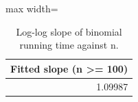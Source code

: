 \begin{table}
\centering
\small
\caption{Log-log slope of binomial running time against n.}
\label{tab:e7_slope}
\begin{adjustbox}{max width=\textwidth}
\begin{tabular}{r}
\toprule
Fitted slope (n >= 100) \\
\midrule
1.09987 \\
\bottomrule
\end{tabular}
\end{adjustbox}
\end{table}
